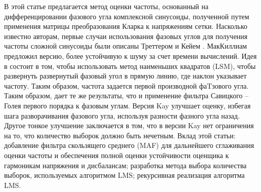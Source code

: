 В этой статье предлагается метод оценки частоты, основанный на дифференцировании фазового угла комплексной синусоиды, полученной путем применения матрицы преобразования Кларка к напряжениям сетки. Насколько известно авторам, первые случаи использования фазовых углов для получения частоты сложной синусоиды были описаны Треттером \cite{tretter1985estimating} и Кейем \cite{kay1989fast}. МакКиллиам \cite{mckilliam2010frequency} предложил версию, более устойчивую к шуму за счет времени вычислений. Идея в \cite{tretter1985estimating} состоит в том, чтобы использовать метод наименьших квадратов (LSM), чтобы развернуть развернутый фазовый угол в прямую линию, где наклон указывает частоту. Таким образом, частота задается первой производной фаTзового угла. Таким образом, \cite{tretter1985estimating} дает те же результаты, что и применение фильтра Савицкого – Голея первого порядка \cite{schafer2011savitzky} к фазовым углам. Версия Kay \cite{kay1989fast} улучшает оценку, избегая шага разворачивания фазового угла, используя разности фазного угла назад. Другое тонкое улучшение заключается в том, что в версии Kay нет ограничения на то, что количество выборок должно быть нечетным. Вклад этой статьи: добавление фильтра скользящего среднего (MAF) для дальнейшего сглаживания оценки частоты и обеспечения полной оценки устойчивости оценщика к гармоникам напряжения и дисбалансам; разработка метода выбора количества выборок, используемых алгоритмом LMS; рекурсивная реализация алгоритма LMS.



